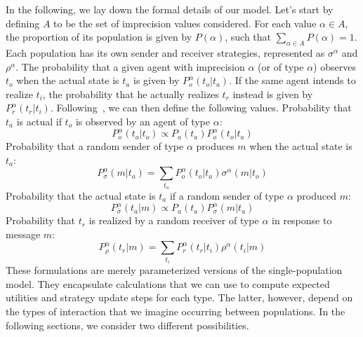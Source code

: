 \documentclass[a4paper]{article}
\begin{document}
In the following, we lay down the formal details of our model.
Let's start by defining $A$ to be the set of imprecision values considered.
For each value $\alpha \in A$, the proportion of its population is given by $P(\alpha)$, such that $\sum_{\alpha \in A} P(\alpha) = 1$.
Each population has its own sender and receiver strategies, represented as $\sigma^\alpha$ and $\rho^\alpha$.
The probability that a given agent with imprecision $\alpha$ (or of type $\alpha$) observes $t_o$ when the actual state is $t_a$ is given by $P_{o}^{\alpha}(t_{o}|t_{a})$.
If the same agent intends to realize $t_i$, the probability that he actually realizes $t_r$ instead is given by $P_{r}^{\alpha}(t_{r}|t_{i})$.
Following~\textcite[26]{franke_vagueness_2017}, we can then define the following values.
Probability that $t_a$ is actual if $t_o$ is observed by an agent of type $\alpha$:
$$
P_{\bar{o}}^{\alpha}(t_{a}|t_{o})\propto P_{a}(t_{a})P_{o}^{\alpha}(t_{o}|t_{a})
$$
Probability that a random sender of type $\alpha$ produces $m$ when the actual state is $t_a$:
$$
P_{\sigma}^{\alpha}(m|t_{a})=\sum_{t_{o}}P_{o}^{\alpha}(t_{o}|t_{a})\sigma^{\alpha}(m|t_{o})
$$
Probability that the actual state is $t_a$ if a random sender of type $\alpha$ produced $m$:
$$
P_{\bar{\sigma}}^{\alpha}(t_{a}|m)\propto P_{a}(t_{a})P_{\sigma}^{\alpha}(m|t_{a})
$$
Probability that $t_r$ is realized by a random receiver of type $\alpha$ in response to message $m$:
$$
P_{\rho}^{\alpha}(t_{r}|m)=\sum_{t_{i}}P_{r}^{\alpha}(t_{r}|t_{i})\rho^{\alpha}(t_{i}|m)
$$
These formulations are merely parameterized versions of the single-population model.
They encapsulate calculations that we can use to compute expected utilities and strategy update steps for each type.
The latter, however, depend on the types of interaction that we imagine occurring between populations.
In the following sections, we consider two different possibilities.
\end{document}
